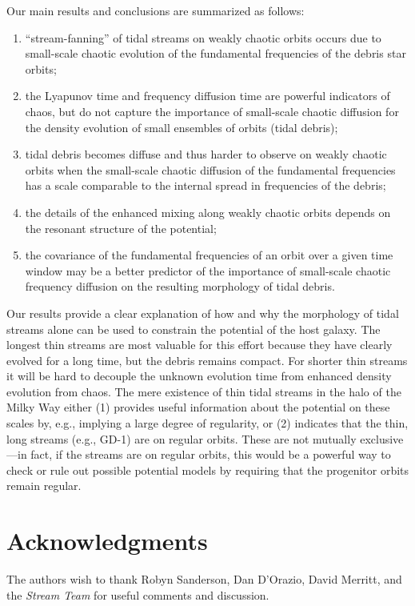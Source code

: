Our main results and conclusions are summarized as follows:
\begin{enumerate}
    \item ``stream-fanning'' of tidal streams on weakly chaotic orbits \citep[as
    seen in simulations by][]{pearson15} occurs due to small-scale chaotic
    evolution of the fundamental frequencies of the debris star orbits;
    \item the Lyapunov time and frequency diffusion time are powerful indicators
    of chaos, but do not capture the importance of small-scale chaotic diffusion
    for the density evolution of small ensembles of orbits (tidal debris);
    \item tidal debris becomes diffuse and thus harder to observe on weakly
    chaotic orbits when the small-scale chaotic diffusion of the fundamental
    frequencies has a scale comparable to the internal spread in frequencies of
    the debris;
    \item the details of the enhanced mixing along weakly chaotic orbits depends
    on the resonant structure of the potential;
    \item the covariance of the fundamental frequencies of an orbit over a given
    time window may be a better predictor of the importance of small-scale
    chaotic frequency diffusion on the resulting morphology of tidal debris.
\end{enumerate}

Our results provide a clear explanation of how and why the morphology of tidal
streams alone can be used to constrain the potential of the host galaxy. The
longest thin streams are most valuable for this effort because they have clearly
evolved for a long time, but the debris remains compact. For shorter thin
streams it will be hard to decouple the unknown evolution time from enhanced
density evolution from chaos. The mere existence of thin tidal streams in the
halo of the Milky Way either (1) provides useful information about the potential
on these scales by, e.g., implying a large degree of regularity, or (2)
indicates that the thin, long streams (e.g., GD-1) are on regular orbits. These
are not mutually exclusive---in fact, if the streams are on regular orbits, this
would be a powerful way to check or rule out possible potential models by
requiring that the progenitor orbits remain regular.

\section*{Acknowledgments}
The authors wish to thank Robyn Sanderson, Dan D'Orazio, David Merritt, and the
\emph{Stream Team} for useful comments and discussion. 

